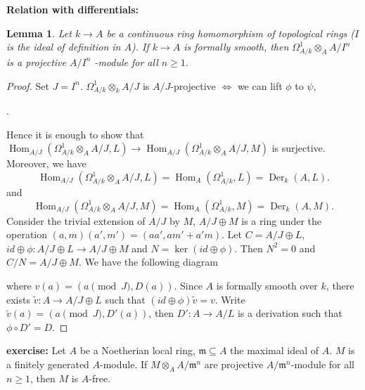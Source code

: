 \documentclass[cs4size]{article}
\newcommand{\su}{\subseteq}
\newcommand{\frm}{\mathfrak{m}}
\newcommand{\ra}{\rightarrow}
\DeclareMathOperator{\Der}{Der}
\DeclareMathOperator{\Hom}{Hom}
\newtheorem{lem}{Lemma}
\begin{document}
\textbf{Relation with differentials: }
\begin{lem}
Let $k\ra A$ be a continuous ring homomorphism of topological rings ($I$ is the ideal of definition in $A$). If $k\ra A$ is formally smooth, then $\Omega_{A/k}^1\otimes_AA/I^n$ is a projective $A/I^n$ -module for all $n\geq 1$.
\end{lem}
\begin{proof}
Set $J=I^n$. $\Omega_{A/k}^1\otimes_kA/J$ is $A/J$-projective $\Leftrightarrow$ we can lift $\phi$ to $\psi$,
.

Hence it is enough to show that $\Hom_{A/J}(\Omega_{A/k}^1\otimes_AA/J,L)\ra \Hom_{A/J}(\Omega_{A/k}^1\otimes_AA/J,M)$ is surjective. Moreover, we have
\[\Hom_{A/J}(\Omega_{A/k}^1\otimes_AA/J,L)=\Hom_A(\Omega_{A/k}^1,L)=\Der_k(A,L).\]
and
\[\Hom_{A/J}(\Omega_{A/k}^1\otimes_AA/J,M)=\Hom_A(\Omega_{A/k}^1,M)=\Der_k(A,M).\]
Consider the trivial extension of $A/J$ by $M$, $A/J\oplus M$ is a ring under the operation $(a,m)(a',m')=(aa',am'+a'm)$. Let $C=A/J\oplus L$, $id\oplus \phi: A/J\oplus L\ra A/J\oplus M$ and $N=\ker(id\oplus\phi)$. Then $N^2=0$  and $C/N=A/J\oplus M$. We have the following diagram

\begin{center}
\end{center}
where $v(a)=(a\pmod{J}, D(a))$.
Since $A$ is formally smooth over $k$, there exists $\tilde{v}: A\ra A/J\oplus L$ such that $(id\oplus \phi)\tilde{v}=v$. Write $\tilde{v}(a)=(a\pmod{J}, D'(a))$, then $D': A\ra A/L$ is a derivation such that $\phi\circ D'=D$.
\end{proof}

\textbf{exercise: }Let $A$ be a Noetherian local ring, $\frm\su A$ the maximal ideal of $A$. $M$ is a finitely generated $A$-module. If $M\otimes_AA/\frm^n$ are projective $A/\frm^n$-module for all $n\geq 1$, then $M$ is $A$-free.
\end{document}
